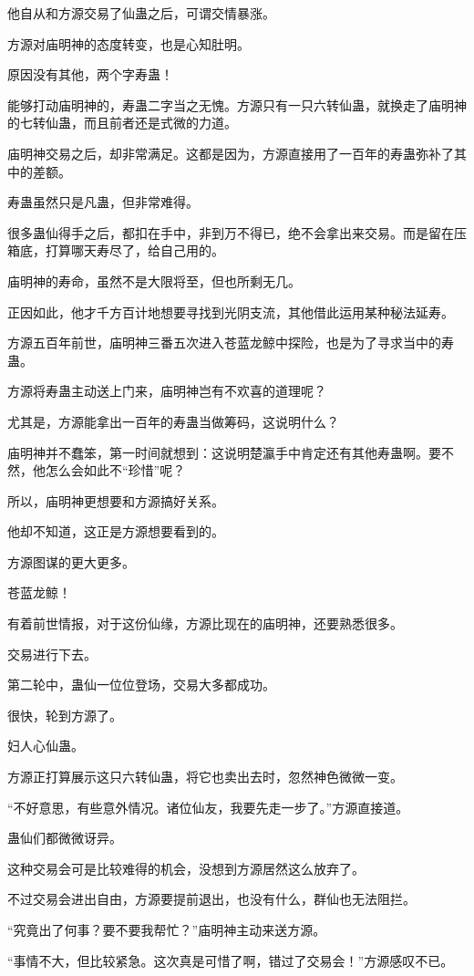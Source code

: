 \begin{this_body}
他自从和方源交易了仙蛊之后，可谓交情暴涨。

方源对庙明神的态度转变，也是心知肚明。

原因没有其他，两个字寿蛊！

能够打动庙明神的，寿蛊二字当之无愧。方源只有一只六转仙蛊，就换走了庙明神的七转仙蛊，而且前者还是式微的力道。

庙明神交易之后，却非常满足。这都是因为，方源直接用了一百年的寿蛊弥补了其中的差额。

寿蛊虽然只是凡蛊，但非常难得。

很多蛊仙得手之后，都扣在手中，非到万不得已，绝不会拿出来交易。而是留在压箱底，打算哪天寿尽了，给自己用的。

庙明神的寿命，虽然不是大限将至，但也所剩无几。

正因如此，他才千方百计地想要寻找到光阴支流，其他借此运用某种秘法延寿。

方源五百年前世，庙明神三番五次进入苍蓝龙鲸中探险，也是为了寻求当中的寿蛊。

方源将寿蛊主动送上门来，庙明神岂有不欢喜的道理呢？

尤其是，方源能拿出一百年的寿蛊当做筹码，这说明什么？

庙明神并不蠢笨，第一时间就想到：这说明楚瀛手中肯定还有其他寿蛊啊。要不然，他怎么会如此不“珍惜”呢？

所以，庙明神更想要和方源搞好关系。

他却不知道，这正是方源想要看到的。

方源图谋的更大更多。

苍蓝龙鲸！

有着前世情报，对于这份仙缘，方源比现在的庙明神，还要熟悉很多。

交易进行下去。

第二轮中，蛊仙一位位登场，交易大多都成功。

很快，轮到方源了。

妇人心仙蛊。

方源正打算展示这只六转仙蛊，将它也卖出去时，忽然神色微微一变。

“不好意思，有些意外情况。诸位仙友，我要先走一步了。”方源直接道。

蛊仙们都微微讶异。

这种交易会可是比较难得的机会，没想到方源居然这么放弃了。

不过交易会进出自由，方源要提前退出，也没有什么，群仙也无法阻拦。

“究竟出了何事？要不要我帮忙？”庙明神主动来送方源。

“事情不大，但比较紧急。这次真是可惜了啊，错过了交易会！”方源感叹不已。


\end{this_body}
